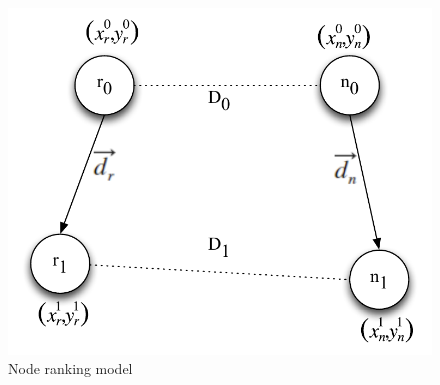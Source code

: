 \begin{figure}[!t]
\centering
\includegraphics[width=4.5in]{Figures/NodeRankingModel.pdf}
\caption{Node ranking model}
\label{Node ranking model}
\end{figure}

